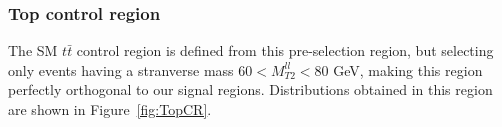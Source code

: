 \documentclass[a4paper, 10pt, openright]{report}
\begin{document}
\subsubsection{Top control region} \label{section:TopCR}

The \ac{SM} $t \bar t$ control region is defined from this pre-selection region, but selecting only events having a stranverse mass $60 < M_{T2}^{ll} < 80$ GeV, making this region perfectly orthogonal to our signal regions. Distributions obtained in this region are shown in Figure~\ref{fig:TopCR}.

\begin{figure}[htbp]
\centering
{}
\end{figure}
\end{document}
